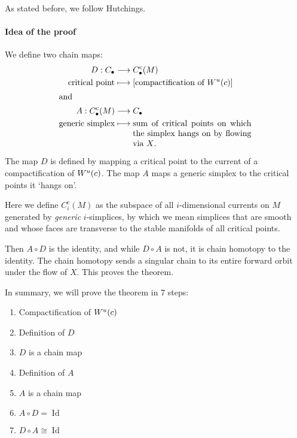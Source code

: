 \begin{myproof}
    As stated before, we follow Hutchings.
    \paragraph{Idea of the proof}
    
    We define two chain maps:
    \begin{align*}
        D: C_\bul &\longrightarrow C_\bul^{\text{c}}(M) \\
         \text{critical point}&\longmapsto [\text{compactification of $\unstable{c}$}]\\
         \shortintertext{and}
        A: C_\bul^{\text{c}}(M) &\longrightarrow C_\bul \\
         \text{generic simplex} &\longmapsto 
         \parbox[t][][t]{5cm}{sum of critical points on which the simplex hangs on by flowing via $X$.}
    \end{align*}
\begin{marginfigure}
    \centering
    \caption{The map $D$ is defined by mapping a critical point to the current of a compactification of $W^u(c)$. The map $A$ maps a generic simplex to the critical points it `hangs on'.}
    \label{fig:idea-of-the-proof-maps-a-and-d}
\end{marginfigure}

    Here we define $C_i^{\text{c}}(M)$ as the subspace of all  $i$-dimensional currents on $M$ generated by \emph{generic} $i$-simplices, by which we mean simplices that are smooth and whose faces are transverse to the stable manifolds of all critical points.


    Then $A  \circ D$ is the identity, and while $D  \circ  A$ is not, it is chain homotopy to the identity.
    The chain homotopy sends a singular chain to its entire forward orbit under the flow of $X$.
    This proves the theorem.

    In summary, we will prove the theorem in $7$ steps:
    \begin{enumerate}
        \item Compactification of $W^u(c)$
        \item Definition of $D$
        \item $D$ is a chain map
        \item Definition of $A$
        \item $A$ is a chain map
        \item $A  \circ D = \operatorname{Id}$
        \item  $D  \circ A \cong \operatorname{Id}$
    \end{enumerate}


\end{myproof}
